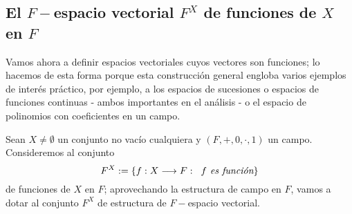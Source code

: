 \subsection{El $F-$espacio vectorial $F^{X}$ de funciones de $X$ en $F$}
\label{subs: F ev de funciones de X en F}
Vamos ahora a definir espacios vectoriales cuyos vectores son funciones;
lo hacemos de esta forma porque esta construcción general engloba varios
ejemplos de interés práctico, por ejemplo, a los espacios de sucesiones o espacios
de funciones continuas - ambos importantes en el análisis - o el
espacio de polinomios con coeficientes en un campo.

Sean $X \neq \emptyset$ un conjunto no vacío cualquiera
y $(F, +, 0, \cdot, 1)$ un campo. Consideremos al conjunto
\[
F^{X} := \{ f: X \longrightarrow F :
\hspace{0.2cm} f \textit{ es función} \} 
\]
de funciones de $X$ en $F$; aprovechando la estructura de campo
en $F$, vamos a dotar al conjunto $F^{X}$ de estructura
de $F-$espacio vectorial.\\


